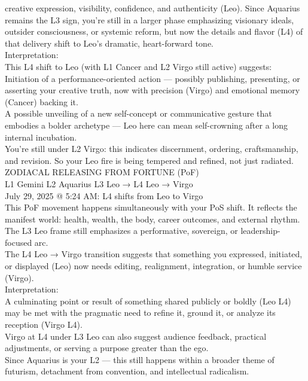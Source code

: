 \documentclass{article}
\begin{document}
creative expression, visibility, confidence, and authenticity (Leo).
Since Aquarius remains the L3 sign, you're still in a larger phase
emphasizing visionary ideals, outsider consciousness, or systemic
reform, but now the details and flavor (L4) of that delivery shift to
Leo's dramatic, heart-forward tone.\\
Interpretation:\\
This L4 shift to Leo (with L1 Cancer and L2 Virgo still active)
suggests:\\
Initiation of a performance-oriented action --- possibly publishing,
presenting, or asserting your creative truth, now with precision (Virgo)
and emotional memory (Cancer) backing it.\\
A possible unveiling of a new self-concept or communicative gesture that
embodies a bolder archetype --- Leo here can mean self-crowning after a
long internal incubation.\\
You're still under L2 Virgo: this indicates discernment, ordering,
craftsmanship, and revision. So your Leo fire is being tempered and
refined, not just radiated.\\
 ZODIACAL RELEASING FROM FORTUNE (PoF)\\
L1 Gemini \textbar{} L2 Aquarius \textbar{} L3 Leo → L4 Leo → Virgo\\
July 29, 2025 @ 5:24 AM: L4 shifts from Leo to Virgo\\
This PoF movement happens simultaneously with your PoS shift. It
reflects the manifest world: health, wealth, the body, career outcomes,
and external rhythm.\\
The L3 Leo frame still emphasizes a performative, sovereign, or
leadership-focused arc.\\
The L4 Leo → Virgo transition suggests that something you expressed,
initiated, or displayed (Leo) now needs editing, realignment,
integration, or humble service (Virgo).\\
Interpretation:\\
A culminating point or result of something shared publicly or boldly
(Leo L4) may be met with the pragmatic need to refine it, ground it, or
analyze its reception (Virgo L4).\\
Virgo at L4 under L3 Leo can also suggest audience feedback, practical
adjustments, or serving a purpose greater than the ego.\\
Since Aquarius is your L2 --- this still happens within a broader theme
of futurism, detachment from convention, and intellectual radicalism.\\
\end{document}
